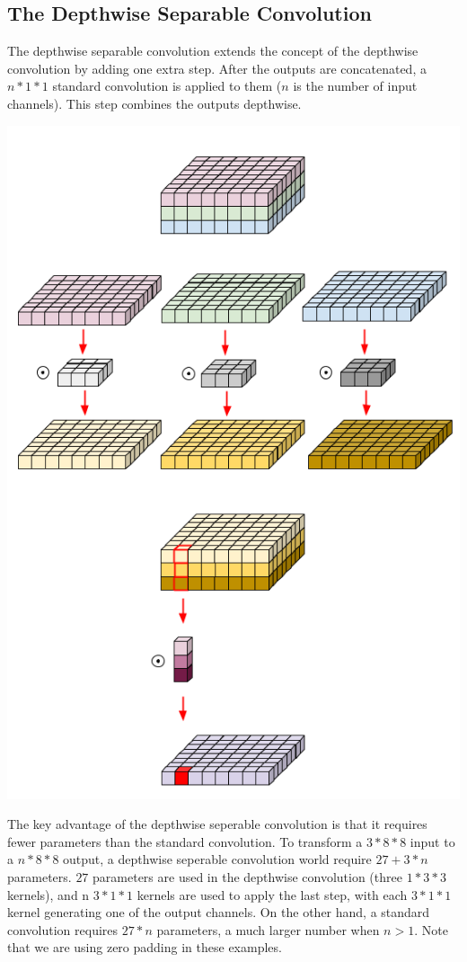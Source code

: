 \documentclass{article}
\begin{document}
\subsection{The Depthwise Separable Convolution}
The depthwise separable convolution extends the concept of the depthwise convolution by adding one extra step. After the outputs are concatenated, a $n * 1 * 1$ standard convolution is applied to them ($n$ is the number of input channels). This step combines the outputs depthwise.   
\begin{center}
\includegraphics[scale=0.35]{depthwise-seperable.png}
\end{center}
The key advantage of the depthwise seperable convolution is that it requires fewer parameters than the standard convolution. To transform a $3 * 8 * 8$ input to a $n * 8 * 8$ output, a depthwise seperable convolution world require $27 + 3*n$ parameters. $27$ parameters are used in the depthwise convolution (three $1 * 3 * 3$ kernels), and n $3 *1 * 1$ kernels are used to apply the last step, with each $3 * 1 *1$ kernel generating one of the output channels. On the other hand, a standard convolution requires $27 * n$ parameters, a much larger number when $n > 1$. Note that we are using zero padding in these examples.  
\end{document}
